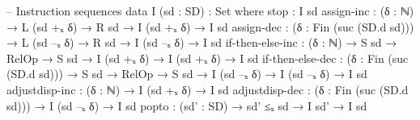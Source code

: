 \documentclass{article}
\begin{document}
\begin{prev}
\begin{code}
-- Instruction sequences
data I (sd : SD) : Set where
    stop : I sd
    assign-inc : (δ : ℕ) → L (sd +ₛ δ) → R sd → I (sd +ₛ δ) → I sd
    assign-dec : (δ : Fin (suc (SD.d sd))) → L (sd –ₛ δ) → R sd 
                    → I (sd –ₛ δ) → I sd
    if-then-else-inc : (δ : ℕ) → S sd → RelOp → S sd 
                            → I (sd +ₛ δ) → I (sd +ₛ δ) → I sd
    if-then-else-dec : (δ : Fin (suc (SD.d sd))) → S sd → RelOp → S sd 
                            → I (sd –ₛ δ) → I (sd –ₛ δ) → I sd
    adjustdisp-inc : (δ : ℕ) → I (sd +ₛ δ) → I sd
    adjustdisp-dec : (δ : Fin (suc (SD.d sd))) → I (sd –ₛ δ) → I sd
    popto : (sd' : SD) → sd' ≤ₛ sd → I sd' → I sd
\end{code}
\end{prev}
\end{document}
